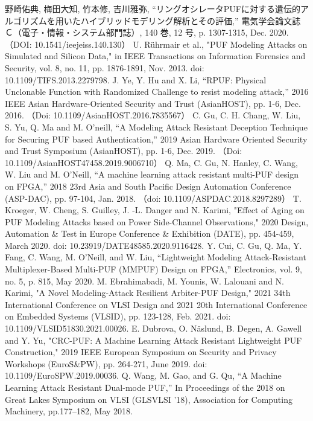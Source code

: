 \documentclass[technicalreport]{ieicej} %
\begin{document}
\begin{thebibliography}{99}
  野崎佑典, 梅田大知, 竹本修, 吉川雅弥,
  “リングオシレータPUFに対する遺伝的アルゴリズムを用いたハイブリッドモデリング解析とその評価,”
  電気学会論文誌Ｃ（電子・情報・システム部門誌）, 140 巻, 12 号, p. 1307-1315, Dec. 2020.
  （DOI: 10.1541/ieejeiss.140.130）
  U. Rührmair et al., "PUF Modeling Attacks on Simulated and Silicon Data,"
  in IEEE Transactions on Information Forensics and Security, vol. 8, no. 11, pp. 1876-1891, Nov. 2013.
  doi: 10.1109/TIFS.2013.2279798.
  J. Ye, Y. Hu and X. Li, “RPUF: Physical Unclonable Function with Randomized Challenge to resist modeling attack,”
  2016 IEEE Asian Hardware-Oriented Security and Trust (AsianHOST), pp. 1-6, Dec. 2016.
  （Doi: 10.1109/AsianHOST.2016.7835567）
  C. Gu, C. H. Chang, W. Liu, S. Yu, Q. Ma and M. O'neill,
  “A Modeling Attack Resistant Deception Technique for Securing PUF based Authentication,”
  2019 Asian Hardware Oriented Security and Trust Symposium (AsianHOST), pp. 1-6, Dec. 2019.
  （Doi: 10.1109/AsianHOST47458.2019.9006710）
  Q. Ma, C. Gu, N. Hanley, C. Wang, W. Liu and M. O'Neill, “A machine learning attack resistant multi-PUF design on FPGA,”
  2018 23rd Asia and South Pacific Design Automation Conference (ASP-DAC), pp. 97-104, Jan. 2018.
  （doi: 10.1109/ASPDAC.2018.8297289）
  T. Kroeger, W. Cheng, S. Guilley, J. -L. Danger and N. Karimi,
  "Effect of Aging on PUF Modeling Attacks based on Power Side-Channel Observations,"
  2020 Design, Automation \& Test in Europe Conference \& Exhibition (DATE), pp. 454-459, March 2020.
  doi: 10.23919/DATE48585.2020.9116428.
  Y. Cui, C. Gu, Q. Ma, Y. Fang, C. Wang, M. O’Neill, and W. Liu, “Lightweight Modeling Attack-Resistant Multiplexer-Based Multi-PUF (MMPUF) Design on FPGA,”
  Electronics, vol. 9, no. 5, p. 815, May 2020.
  M. Ebrahimabadi, M. Younis, W. Lalouani and N. Karimi, "A Novel Modeling-Attack Resilient Arbiter-PUF Design,"
  2021 34th International Conference on VLSI Design and 2021 20th International Conference on Embedded Systems (VLSID), pp. 123-128, Feb. 2021.
  doi: 10.1109/VLSID51830.2021.00026.
  E. Dubrova, O. Näslund, B. Degen, A. Gawell and Y. Yu, "CRC-PUF: A Machine Learning Attack Resistant Lightweight PUF Construction,"
  2019 IEEE European Symposium on Security and Privacy Workshops (EuroS\&PW), pp. 264-271, June 2019.
  doi: 10.1109/EuroSPW.2019.00036.
  Q. Wang, M. Gao, and G. Qu, “A Machine Learning Attack Resistant Dual-mode PUF,”
  In Proceedings of the 2018 on Great Lakes Symposium on VLSI (GLSVLSI '18),
  Association for Computing Machinery, pp.177–182, May 2018.
\end{thebibliography}


\end{document}
